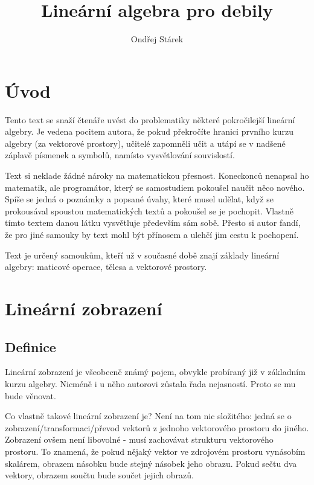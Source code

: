 \documentclass[a5paper,12pt]{amsbook}
\theoremstyle{definition}
\begin{document}
\title{Lineární algebra pro debily}
\author{Ondřej Stárek}
\maketitle

\chapter{Úvod}

\noindent Tento text se snaží čtenáře uvést do problematiky některé pokročilejší lineární algebry.
Je vedena pocitem autora, že pokud překročíte hranici prvního kurzu algebry (za vektorové
prostory), učitelé zapomněli učit a utápí se v nadšené záplavě písmenek a symbolů, namísto
vysvětlování souvislostí.

Text si neklade žádné nároky na matematickou přesnost. Koneckonců nenapsal ho matematik,
ale programátor, který se samostudiem pokoušel naučit něco nového. Spíše se jedná o poznámky
a popsané úvahy, které musel udělat, když se prokousával spoustou matematických textů
a pokoušel se je pochopit. Vlastně tímto textem danou látku vysvětluje především sám sobě.
Přesto si autor fandí, že pro jiné samouky by text mohl být přínosem a ulehčí jim cestu
k pochopení.

Text je určený samoukům, kteří už v současné době znají základy lineární algebry: maticové
operace, tělesa a vektorové prostory.

\chapter{Lineární zobrazení}

\section{Definice}

\noindent Lineární zobrazení je všeobecně známý pojem, obvykle probíraný již v základním kurzu
algebry. Nicméně i u něho autorovi zůstala řada nejasností. Proto se mu bude věnovat.

Co vlastně takové lineární zobrazení je? Není na tom nic složitého: jedná se
o zobrazení/transformaci/převod vektorů z jednoho vektorového prostoru do jiného. Zobrazení ovšem
není libovolné - musí zachovávat strukturu vektorového prostoru. To znamená, že pokud nějaký vektor
ve zdrojovém prostoru vynásobím skalárem, obrazem násobku bude stejný násobek jeho obrazu. Pokud
sečtu dva vektory, obrazem součtu bude součet jejich obrazů. 
\end{document}
